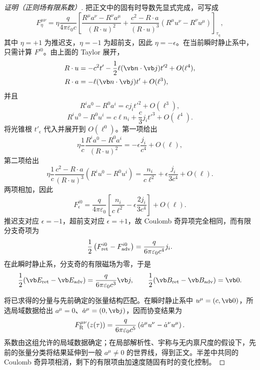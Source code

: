 \begin{proof}[证明（正则场有限系数）]
把正文中的固有时导数先显式完成，可写成
\[
 F_{\eta}^{\mu\nu}
 =\eta\frac{q}{4\pi\varepsilon_0c}
 \left[
 \frac{R^\mu a^\nu-R^\nu a^\mu}{(R\cdot u)^2}
 +\frac{c^2-R\cdot a}{(R\cdot u)^3}
 (R^\mu u^\nu-R^\nu u^\mu)
 \right]_{\tau_\eta},
\]
其中 \(\eta=+1\) 为推迟支，\(\eta=-1\) 为超前支，因此 \(\eta=-\epsilon\)。在当前瞬时静止系中，只需计算 \(F^{i0}\)。由上面的 Taylor 展开，
\[
\begin{aligned}
 R\cdot u
 &=-c^2t'-\frac12\ell(\vb n\cdot\vb j)t'^2+O(\ell^4),\\
 R\cdot a
 &=-\ell(\vb n\cdot\vb j)t'+O(\ell^3),
\end{aligned}
\]
并且
\[
 R^ia^0-R^0a^i
 =c j_i t'^2+O(\ell^3),
\]
\[
 R^iu^0-R^0u^i
 =c\ell n_i+\frac{c}{3}j_i t'^3+O(\ell^4).
\]
将光锥根 \(t'_{\epsilon}\) 代入并展开到 \(O(\ell^0)\)。第一项给出
\[
 \eta\frac1c
 \frac{R^ia^0-R^0a^i}{(R\cdot u)^2}
 =-\epsilon\frac{j_i}{c^4}+O(\ell),
\]
第二项给出
\[
 \eta\frac1c
 \frac{c^2-R\cdot a}{(R\cdot u)^3}
 (R^iu^0-R^0u^i)
 =\frac{n_i}{c\ell^2}
 +\epsilon\frac{j_i}{3c^4}+O(\ell).
\]
两项相加，因此
\[
 F_{\epsilon}^{i0}
 =\frac{q}{4\pi\varepsilon_0}
 \left[
 \frac{n_i}{c\ell^2}
 -\epsilon\frac{2j_i}{3c^4}
 \right]+O(\ell).
\]
推迟支对应 \(\epsilon=-1\)，超前支对应 \(\epsilon=+1\)，故 Coulomb 奇异项完全相同，而有限分支奇项为
\[
 \frac12\left(F_{\rm ret}^{i0}-F_{\rm adv}^{i0}\right)
 =\frac{q}{6\pi\varepsilon_0c^4}j_i.
\]
在此瞬时静止系，分支奇的有限磁场为零，于是
\[
 \frac12(\vb E_{\rm ret}-\vb E_{\rm adv})
 =\frac{q}{6\pi\varepsilon_0c^3}\vb j,
 \qquad
 \frac12(\vb B_{\rm ret}-\vb B_{\rm adv})=\vb0.
\]

将已求得的分量与先前确定的张量结构匹配。在瞬时静止系中 \(u^\mu=(c,\vb0)\)，所选局域数据给出 \(a^\mu=0\)、\(\dot a^\mu=(0,\vb j)\)，因而协变结果为
\[
 F_{\rm R}^{\mu\nu}(z(\tau))
 =\frac{q}{6\pi\varepsilon_0c^5}
 \left(\dot a^\mu u^\nu-\dot a^\nu u^\mu\right).
\]
系数由这组允许的局域数据确定；在局部解析性、宇称与无内禀尺度的假设下，先前的张量分类将结果延伸到一般 \(a^\mu\neq0\) 的世界线，得到正文。半差中共同的 Coulomb 奇异项相消，剩下的有限项由加速度随固有时的变化控制。

\end{proof}
